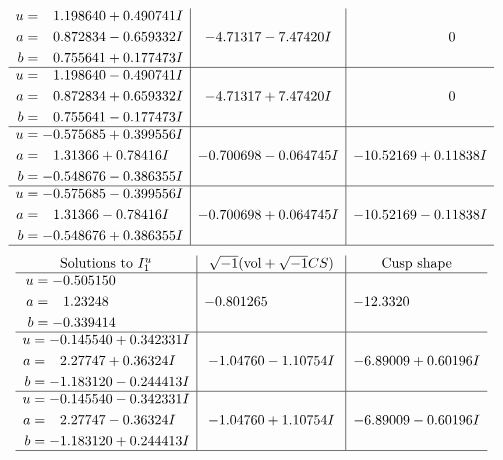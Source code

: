 \documentclass[1p]{elsarticle_modified}
\theoremstyle{definition}
\newcommand{\I}{\sqrt{-1}}
\begin{document}
$$\begin{array}{c|c|c}
\begin{aligned}
u &= \phantom{-}1.198640 + 0.490741 I \\
a &= \phantom{-}0.872834 - 0.659332 I \\
b &= \phantom{-}0.755641 + 0.177473 I\end{aligned}
 & -4.71317 - 7.47420 I & \phantom{-0.000000 } 0 \\ \hline\begin{aligned}
u &= \phantom{-}1.198640 - 0.490741 I \\
a &= \phantom{-}0.872834 + 0.659332 I \\
b &= \phantom{-}0.755641 - 0.177473 I\end{aligned}
 & -4.71317 + 7.47420 I & \phantom{-0.000000 } 0 \\ \hline\begin{aligned}
u &= -0.575685 + 0.399556 I \\
a &= \phantom{-}1.31366 + 0.78416 I \\
b &= -0.548676 - 0.386355 I\end{aligned}
 & -0.700698 - 0.064745 I & -10.52169 + 0.11838 I \\ \hline\begin{aligned}
u &= -0.575685 - 0.399556 I \\
a &= \phantom{-}1.31366 - 0.78416 I \\
b &= -0.548676 + 0.386355 I\end{aligned}
 & -0.700698 + 0.064745 I & -10.52169 - 0.11838 I\\
 \hline 
 \end{array}$$\newpage$$\begin{array}{c|c|c}  
\text{Solutions to }I^u_{1}& \I (\text{vol} + \sqrt{-1}CS) & \text{Cusp shape}\\
 \hline 
\begin{aligned}
u &= -0.505150\phantom{ +0.000000I} \\
a &= \phantom{-}1.23248\phantom{ +0.000000I} \\
b &= -0.339414\phantom{ +0.000000I}\end{aligned}
 & -0.801265\phantom{ +0.000000I} & -12.3320\phantom{ +0.000000I} \\ \hline\begin{aligned}
u &= -0.145540 + 0.342331 I \\
a &= \phantom{-}2.27747 + 0.36324 I \\
b &= -1.183120 - 0.244413 I\end{aligned}
 & -1.04760 - 1.10754 I & -6.89009 + 0.60196 I \\ \hline\begin{aligned}
u &= -0.145540 - 0.342331 I \\
a &= \phantom{-}2.27747 - 0.36324 I \\
b &= -1.183120 + 0.244413 I\end{aligned}
 & -1.04760 + 1.10754 I & -6.89009 - 0.60196 I\\
 \hline 
 \end{array}$$\newpage\newpage\renewcommand{\arraystretch}{1}
\end{document}
